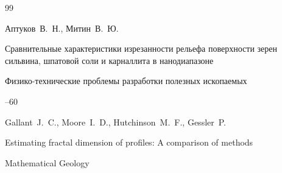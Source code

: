 \begin{thebibliography}{99}













\by Аптуков~В.~Н., Митин~В.~Ю.

\paper Сравнительные характеристики изрезанности рельефа поверхности зерен сильвина, шпатовой соли и карналлита в нанодиапазоне 

\jour Физико-технические проблемы разработки полезных ископаемых 



--60















\by     Gallant~J.~C., Moore~I.~D.,  Hutchinson~M.~F., Gessler~P.

\paper Estimating fractal dimension of profiles: A comparison of methods

\jour Mathematical Geology




\end{thebibliography}
